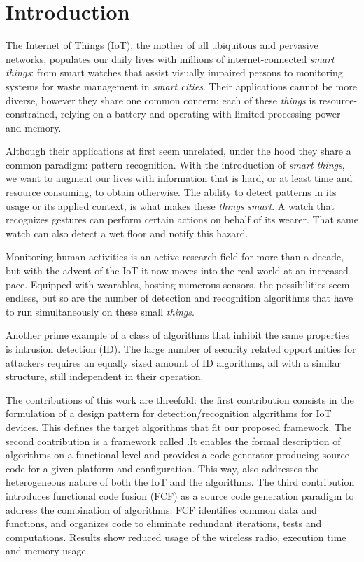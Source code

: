 \documentclass[3p,times,procedia]{elsarticle}
\begin{document}
\section{Introduction}
\label{introduction}

The Internet of Things (IoT), the mother of all ubiquitous and pervasive
networks, populates our daily lives with millions of internet-connected
\emph{smart things}: from smart watches that assist visually impaired
persons\cite{porzi2013smart} to monitoring systems for waste management in
\emph{smart cities}\cite{zanella2014internet}. Their applications cannot be
more diverse, however they share one common concern: each of these
\emph{things} is resource-constrained, relying on a battery and operating with
limited processing power and memory.

Although their applications at first seem unrelated, under the hood they share
a common paradigm: pattern recognition. With the introduction of \emph{smart
things}, we want to augment our lives with information that is hard, or at
least time and resource consuming, to obtain otherwise. The ability to detect
patterns in its usage or its applied context, is what makes these \emph{things}
\emph{smart}. A watch that recognizes gestures can perform certain actions on
behalf of its wearer. That same watch can also detect a wet floor and notify
this hazard\cite{porzi2013smart}.

Monitoring human activities is an active research field for more than a
decade\cite{lara2013survey}, but with the advent of the IoT it now moves into
the real world at an increased pace. Equipped with wearables, hosting numerous
sensors, the possibilities seem endless, but so are the number of detection and
recognition algorithms that have to run simultaneously on these small
\emph{things}.

Another prime example of a class of algorithms that inhibit the same properties
is intrusion detection (ID). The large number of security related opportunities
for attackers requires an equally sized amount of ID algorithms, all with a
similar structure, still independent in their operation.


The contributions of this work are threefold: the first contribution consists
in the formulation of a design pattern for detection/recognition algorithms for
IoT devices. This defines the target algorithms that fit our proposed
framework. The second contribution is a framework called \FOO.\@ It enables the
formal description of algorithms on a functional level and provides a code
generator producing source code for a given platform and configuration. This
way, \FOO also addresses the heterogeneous nature of both the IoT and the
algorithms. The third contribution introduces functional code fusion (FCF) as a
source code generation paradigm to address the combination of algorithms. FCF
identifies common data and functions, and organizes code to eliminate redundant
iterations, tests and computations. Results show reduced usage of the wireless
radio, execution time and memory usage.
\end{document}
